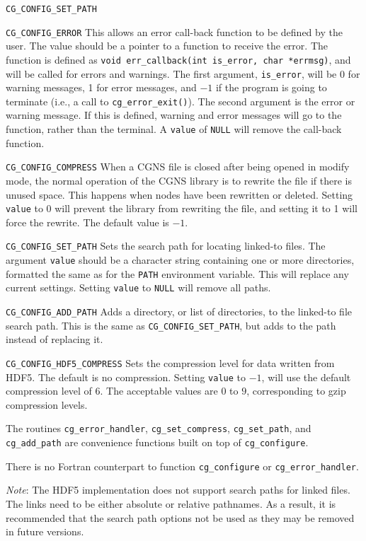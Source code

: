 \begin{Ventryi}{\texttt{CG\_CONFIG\_SET\_PATH}}
\item [\texttt{CG\_CONFIG\_ERROR}]
      This allows an error call-back function to be defined by the
      user.
      The value should be a pointer to a function to receive the error.
      The function is defined as \texttt{void err\_callback(int is\_error,
      char *errmsg)}, and will be called for errors and warnings.
      The first argument, \texttt{is\_error}, will be 0 for warning
      messages, 1 for error messages, and $-1$ if the program is
      going to terminate (i.e., a call to \texttt{cg\_error\_exit()}).
      The second argument is the error or warning message.
      If this is defined, warning and error messages will go to the
      function, rather than the terminal.
      A \texttt{value} of \texttt{NULL} will remove the call-back
      function.
\item [\texttt{CG\_CONFIG\_COMPRESS}]
      When a CGNS file is closed after being opened in modify mode, the
      normal operation of the CGNS library is to rewrite the file if
      there is unused space.
      This happens when nodes have been rewritten or deleted.
      Setting \texttt{value} to 0 will prevent the library from
      rewriting the file, and setting it to 1 will force the rewrite.
      The default value is $-1$.
\item [\texttt{CG\_CONFIG\_SET\_PATH}]
      Sets the search path for locating linked-to files.
      The argument \texttt{value} should be a character string
      containing one or more directories, formatted the same as for the
      \texttt{PATH} environment variable.
      This will replace any current settings.
      Setting \texttt{value} to \texttt{NULL} will remove all paths.
\item [\texttt{CG\_CONFIG\_ADD\_PATH}]
      Adds a directory, or list of directories, to the linked-to file
      search path.
      This is the same as \texttt{CG\_CONFIG\_SET\_PATH}, but adds to
      the path instead of replacing it.
\item [\texttt{CG\_CONFIG\_HDF5\_COMPRESS}]
      Sets the compression level for data written from HDF5. The default 
      is no compression. Setting \texttt{value} to $-1$, will use the default 
      compression level of $6$. The acceptable values are $0$ to $9$, 
      corresponding to gzip compression levels.
\end{Ventryi}

The routines \texttt{cg\_error\_handler}, \texttt{cg\_set\_compress}, 
\texttt{cg\_set\_path}, and \texttt{cg\_add\_path} are convenience functions 
built on top of \texttt{cg\_configure}.

There is no Fortran counterpart to function \texttt{cg\_configure} or 
\texttt{cg\_error\_handler}. 

\textit{Note}: The HDF5 implementation does not support search paths
for linked files. The links need to be either absolute or relative
pathnames. As a result, it is recommended that the search path options
not be used as they may be removed in future versions.

